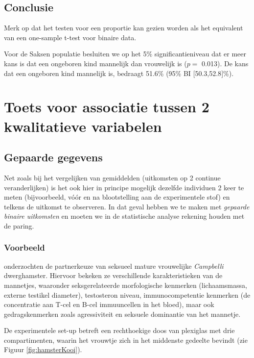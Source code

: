 \documentclass[12pt,dutch,coursenotes]{book}
\theoremstyle{definition}
\theoremstyle{definition}
\theoremstyle{definition}
\theoremstyle{remark}
\begin{document}
\subsection{Conclusie}\label{conclusie}

Merk op dat het testen voor een proportie kan gezien worden als het
equivalent van een one-sample t-test voor binaire data.

Voor de Saksen populatie besluiten we op het 5\% significantieniveau dat
er meer kans is dat een ongeboren kind mannelijk dan vrouwelijk is
(\(p=\) 0.013). De kans dat een ongeboren kind mannelijk is, bedraagt
51.6\% (95\% BI {[}50.3,52.8{]}\%).

\section{Toets voor associatie tussen 2 kwalitatieve
variabelen}\label{toets-voor-associatie-tussen-2-kwalitatieve-variabelen}

\subsection{Gepaarde gegevens}\label{gepaarde-gegevens}

Net zoals bij het vergelijken van gemiddelden (uitkomsten op 2 continue
veranderlijken) is het ook hier in principe mogelijk dezelfde individuen
2 keer te meten (bijvoorbeeld, vóór en na blootstelling aan de
experimentele stof) en telkens de uitkomst te observeren. In dat geval
hebben we te maken met \emph{gepaarde binaire uitkomsten} en moeten we
in de statistische analyse rekening houden met de paring.

\subsubsection{Voorbeeld}\label{voorbeeld}

\citet{Rogovin2017} onderzochten de partnerkeuze van seksueel mature
vrouwelijke \emph{Campbelli} dwerghamster. Hiervoor bekeken ze
verschillende karakteristieken van de mannetjes, waaronder
seksgerelateerde morfologische kenmerken (lichaamsmassa, externe
testikel diameter), testosteron niveau, immunocompetentie kenmerken (de
concentratie aan T-cel en B-cel immuuncellen in het bloed), maar ook
gedragskenmerken zoals agressiviteit en seksuele dominantie van het
mannetje.

De experimentele set-up betreft een rechthoekige doos van plexiglas met
drie compartimenten, waarin het vrouwtje zich in het middenste gedeelte
bevindt (zie Figuur \ref{fig:hamsterKooi}).
\end{document}
